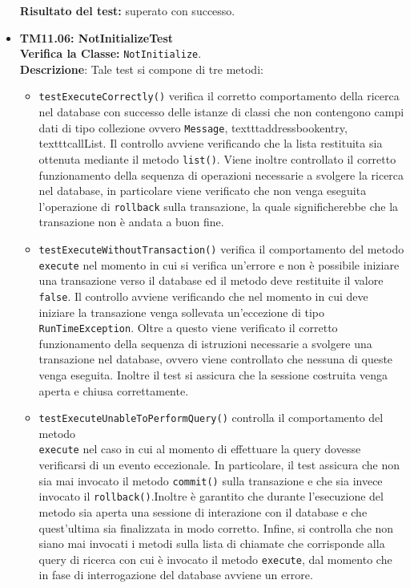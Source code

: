\begin{itemize}
\begin{itemize}
\end{itemize}
\textbf{Risultato del test:} superato con successo.

\item \textbf{TM11.06: NotInitializeTest}\\
\textbf{Verifica la Classe:} \texttt{NotInitialize}.\\
\textbf{Descrizione}: %
Tale test si compone di tre metodi:
\begin{itemize}
\item \texttt{testExecuteCorrectly()} verifica il corretto comportamento della ricerca nel database con successo delle istanze di classi che non contengono campi dati di tipo collezione ovvero \texttt{Message}, texttt{addressbookentry}, texttt{callList}.  
Il controllo avviene verificando che la lista restituita sia ottenuta mediante il metodo \texttt{list()}. 
Viene inoltre controllato il corretto funzionamento della sequenza di operazioni necessarie a svolgere la ricerca nel database, in particolare viene verificato che non venga eseguita l'operazione di \texttt{rollback} sulla transazione, la quale significherebbe che la transazione non è andata a buon fine.

\item \texttt{testExecuteWithoutTransaction()} verifica il comportamento del metodo \\ \texttt{execute} nel momento in cui si verifica un'errore e non è possibile iniziare una transazione verso il database ed il metodo deve restituite il valore \texttt{false}. Il controllo avviene verificando che nel momento in cui deve iniziare la transazione venga sollevata un'eccezione di tipo \texttt{RunTimeException}. Oltre a questo viene verificato il corretto funzionamento della sequenza di istruzioni necessarie a svolgere una transazione nel database, ovvero viene controllato che nessuna di queste venga eseguita. Inoltre il test si assicura che la sessione costruita venga aperta e chiusa correttamente.

\item \texttt{testExecuteUnableToPerformQuery()} controlla il comportamento del metodo \\ \texttt{execute} nel caso in cui al momento di effettuare la query dovesse verificarsi di un evento eccezionale. In particolare, il test assicura che non sia mai invocato il metodo \texttt{commit()} sulla transazione e che sia invece invocato il \texttt{rollback()}.Inoltre è garantito che durante l'esecuzione del metodo sia aperta una sessione di interazione con il database e che quest'ultima sia finalizzata in modo corretto. Infine, si controlla che non siano mai invocati i metodi sulla lista di chiamate che corrisponde alla query di ricerca con cui è invocato il metodo \texttt{execute}, dal momento che in fase di interrogazione del database avviene un errore.


\end{itemize}
\end{itemize}
